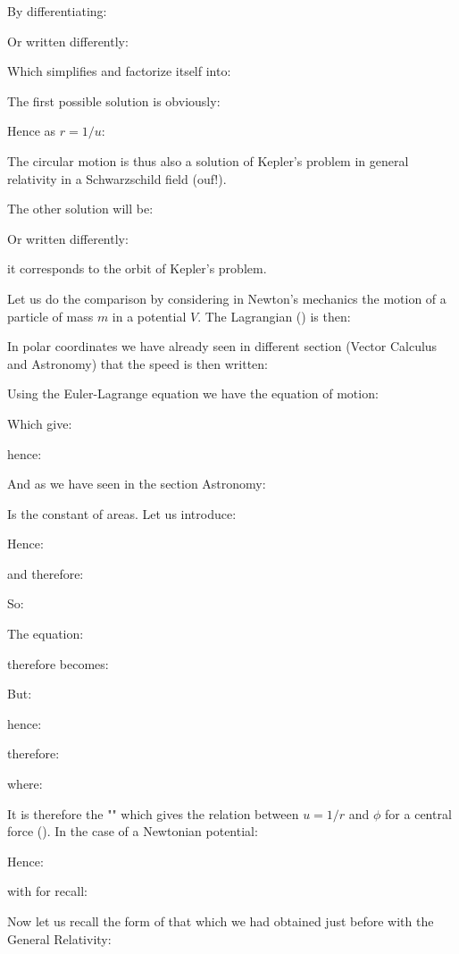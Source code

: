 	By differentiating:
	
	Or written differently:
	
	Which simplifies and factorize itself into:
	
	The first possible solution is obviously:
	
	Hence as $r=1/u$:
	
	The circular motion is thus also a solution of Kepler's problem in general relativity in a Schwarzschild field (ouf!).

	The other solution will be:
	
	Or written differently:
	
	it corresponds to the orbit of Kepler's problem.

	Let us do the comparison by considering in Newton's mechanics the motion of a particle of mass $m$ in a potential $V$. The Lagrangian () is then:
	
	In polar coordinates we have already seen in different section (Vector Calculus and Astronomy) that the speed is then written:
	
	Using the Euler-Lagrange equation we have the equation of motion:
	
	Which give:
	
	hence:
	
	And as we have seen in the section Astronomy:
	
	Is the constant of areas. Let us introduce:
	
	Hence:
	
	and therefore:
	
	So:
	
	The equation:
	
	therefore becomes:
	
	But:
	
	hence:
	
	therefore:
	
	where:
	
	It is therefore the "" which gives the relation between $u = 1 / r$ and $\phi$ for a central force (). In the case of a Newtonian potential:
	
	Hence:
	
	with for recall:
	
	Now let us recall the form of that which we had obtained just before with the General Relativity:
	
